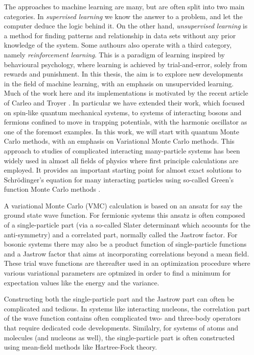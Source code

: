 \documentclass[twoside,english]{uiofysmaster}
\begin{document}
The approaches to machine learning are many, but are often split into
two main categories.  In {\em supervised learning} we know the answer
to a problem, and let the computer deduce the logic behind it. On the
other hand, {\em unsupervised learning} is a method for finding
patterns and relationship in data sets without any prior knowledge of
the system.  Some authours also operate with a third category, namely
{\em reinforcement learning}. This is a paradigm of learning inspired
by behavioural psychology, where learning is achieved by
trial-and-error, solely from rewards and punishment.  In this thesis,
the aim is to explore new developments in the field of machine 
learning, with an emphasis on unsupervided learning. Much of the work
here and its implementations is motivated by the recent article of
Carleo and Troyer \cite{carleo2017}. In particular we have extended
their work, which focused on spin-like quantum mechanical systems, to
systems of interacting bosons and fermions confined to move in
trapping potentials, with the harmonic oscillator as one of the
foremost examples.  
In this work, we will start with quantum Monte Carlo methods,
with an emphasis on Variational Monte Carlo methods.  This approach to
studies of complicated interacting many-particle systems has been
widely used in almost all fields of physics where first principle calculations are 
employed. It provides an important starting  point
for almost exact solutions to Schr\"odinger's equation for many
interacting particles using so-called Green's function Monte Carlo methods \cite{Hammond1994}.

A variational Monte Carlo (VMC) calculation is based on an ansatz for
say the ground state wave function.  For fermionic systems this ansatz
is often composed of a single-particle part (via a so-called Slater
determinant which acoounts for the anti-symmetry) and a correlated
part, normally called the Jastrow factor.  For bosonic systems there
may also be a product function of single-particle functions and a
Jastrow factor that aims at incorporating correlations beyond a mean
field.  These trial wave functions are thereafter used in an
optimization procedure where various variational parameters are
optmized in order to find a minimum for expectation values like the
energy and the variance.

Constructing both the single-particle part and the Jastrow part can
often be complicated and tedious.  In systems like interacting
nucleons, the correlation part of the wave function contains often
complicated two- and three-body operators that require dedicated code
developments. Similalry, for systems of atoms and molecules (and
nucleons as well), the single-particle part is often constructed using
mean-field methods like Hartree-Fock theory.
\end{document}

